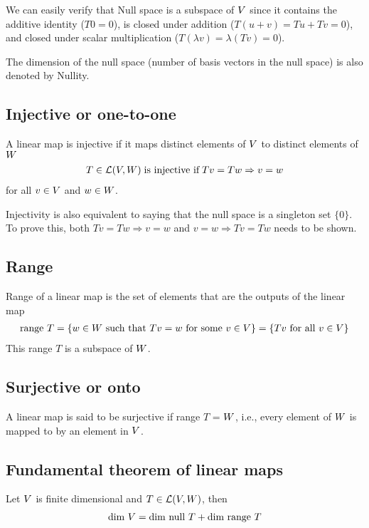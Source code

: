 \documentclass[../../linear_algebra.tex]{subfiles}
\begin{document}
We can easily verify that Null space is a subspace of $V$ since it contains the additive identity ($T0 = 0$), is closed under addition ($T(u + v) = Tu + Tv = 0$), and closed under scalar multiplication ($T(\lambda v) = \lambda(Tv) = 0$).\newline

The dimension of the null space (number of basis vectors in the null space) is also denoted by Nullity.

\subsection{Injective or one-to-one}
A linear map is injective if it maps distinct elements of $V$ to distinct elements of $W$
\begin{align*}
    T \in \mathcal{L}(V, W) \; \text{is injective if} \; Tv = Tw \Rightarrow v = w
\end{align*}
for all $v \in V$ and $w \in W$.\newline

Injectivity is also equivalent to saying that the null space is a singleton set $\{0 \}$. To prove this, both $Tv = Tw \Rightarrow v = w$ and $v = w \Rightarrow Tv = Tw$ needs to be shown.


\subsection{Range}
Range of a linear map is the set of elements that are the outputs of the linear map
\begin{align*}
    \text{range } T = \{ w \in W \text{ such that } Tv = w \text{ for some } v \in V\} = \{ Tv \text{ for all } v \in V \}
\end{align*}
This range $T$ is a subspace of $W$.


\subsection{Surjective or onto}
A linear map is said to be surjective if range $T$ = $W$, i.e., every element of $W$ is mapped to by an element in $V$.

\subsection{Fundamental theorem of linear maps}\label{fundamental_theorem_linear_maps}
Let $V$ is finite dimensional and $T \in \mathcal{L}(V, W)$, then
\begin{align*}
    \text{dim } V = \text{dim null } T + \text{dim range } T
\end{align*}
\end{document}
